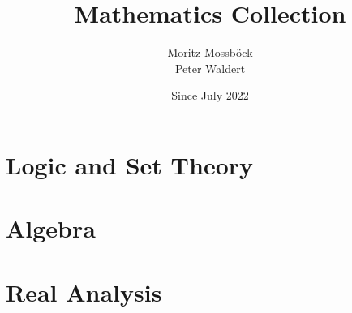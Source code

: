 \documentclass{report}
\author{Moritz Mossböck \\ Peter Waldert}
\title{\textbf{Mathematics Collection}}
\date{Since July 2022}
\begin{document}
    \pagestyle{empty}
    \begin{titlepage}
        \maketitle
    \end{titlepage}

    

    \pagestyle{fancy}
    \tableofcontents

    \newpage
    
    \chapter{Logic and Set Theory}\label{chp:logic_set}
    
    

    \chapter{Algebra}\label{chp:algebra}
    \thispagestyle{empty}
    

    \chapter{Real Analysis}\label{chp:real_analysis}
    \thispagestyle{empty}
    
\end{document}
